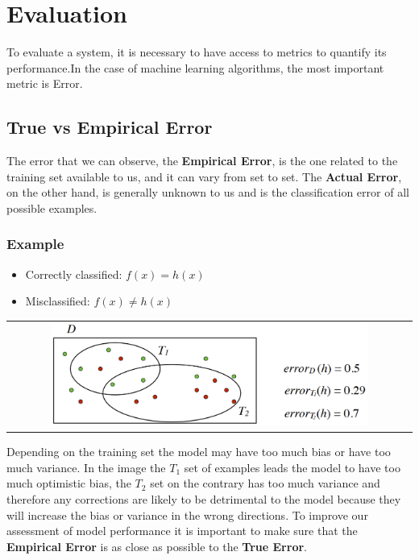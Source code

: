 \section{Evaluation}

To evaluate a system, it is necessary to have access to metrics to quantify its performance.In the case of machine learning algorithms, the most important metric is Error.

\subsection{True vs Empirical Error}
The error that we can observe, the \textbf{Empirical Error}, is the one related to the training set available to us, and it can vary from set to set. The \textbf{Actual Error}, on the other hand, is generally unknown to us and is the classification error of all possible examples.

\subsubsection{Example}
\begin{itemize}
    \item[\textcolor{green!50!black}{\textbullet}] Correctly classified: $f(x) = h(x)$
    \item[\textcolor{red}{\textbullet}] Misclassified: $f(x) \not= h(x)$
\end{itemize}
\begin{center}
    \begin{tabular}{c}
        \includegraphics[width=0.8\textwidth]{images/Error.png}
    \end{tabular}
\end{center}
Depending on the training set the model may have too much bias or have too much variance.  In the image the $T_1$ set of examples leads the model to have too much optimistic bias, the $T_2$ set on the contrary has too much variance and therefore any corrections are likely to be detrimental to the model because they will increase the bias or variance in the wrong directions.  To improve our assessment of model performance it is important to make sure that the \textbf{Empirical Error} is as close as possible to the \textbf{True Error}.

